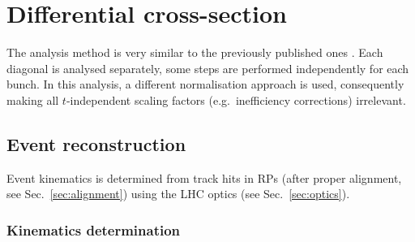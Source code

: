 \section{Differential cross-section}

The analysis method is very similar to the previously published ones \cite{prl111,epl101-el}. Each diagonal is analysed
separately, some steps are performed independently for each bunch. In this analysis, a different normalisation
approach is used, consequently making all $t$-independent scaling factors (e.g.~inefficiency corrections)
irrelevant.

\subsection{Event reconstruction}

Event kinematics is determined from track hits in RPs (after proper alignment, see Sec.~\ref{sec:alignment}) using the LHC optics (see Sec.~\ref{sec:optics}).


\subsubsection{Kinematics determination}
\label{sec:kinematics}

